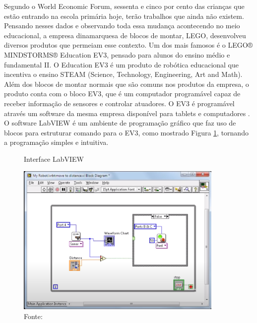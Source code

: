 Segundo o World Economic Forum, sessenta e cinco por cento das crianças que estão entrando na escola primária hoje, terão trabalhos que ainda não existem. Pensando  nesses dados e observando toda essa mudança acontecendo no meio educacional, a empresa dinamarquesa de blocos de montar, LEGO, desenvolveu diversos produtos que permeiam esse contexto. Um dos mais famosos é o LEGO® MINDSTORMS® Education EV3, pensado para alunos do ensino médio e fundamental II. O Education EV3 é um produto de robótica educacional que incentiva o ensino STEAM (Science, Technology, Engineering, Art and Math). Além dos blocos de montar normais que são comuns nos produtos da empresa, o produto conta com o bloco EV3, que é um computador programável capaz de receber informação de sensores e controlar atuadores. O EV3 é programável através um software da mesma empresa disponível para tablets e computadores \cite{lego_mindstorms}. O software LabVIEW é um ambiente de programação gráfico que faz uso de blocos para estruturar comando para o EV3, como mostrado Figura \ref{figura:labview}, tornando a programação simples e intuitiva. 

\begin{figure}[h!]
    \centering
    \caption{Interface LabVIEW}
    \includegraphics[width=10cm]{images/cap2/labview.png}
    \caption*{Fonte:}
    \label{figura:labview}
\end{figure}

